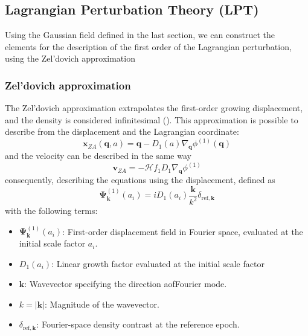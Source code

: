 \subsection{Lagrangian Perturbation Theory (LPT)}
\label{subsec:lpt_methodology}

Using the Gaussian field defined in the last section, we can construct the elements for the description of the first order of the Lagrangian perturbation, using the Zel'dovich approximation

\subsubsection{Zel'dovich approximation}

The Zel'dovich approximation extrapolates the first-order growing displacement, and the density is considered infinitesimal (\cite{white2014zeldovich,Tiago_Batalha_Lecture_7}). This approximation is possible to describe from the displacement and the Lagrangian coordinate:
    \begin{equation}
        \mathbf{x}_{ZA}(\mathbf{q},a)
        = \mathbf{q} - D_1(a)\nabla_{\mathbf{q}}\phi^{(1)}(\mathbf{q})
    \end{equation}
and the velocity can be described in the same way
    \begin{equation}
        \mathbf{v}_{ZA}
        = -\mathcal{H}f_1D_1\nabla_{\mathbf{q}}\phi^{(1)}
    \end{equation}
consequently, describing the equations using the displacement, defined as
    \begin{equation}
        \mathbf{\Psi}^{(1)}_{\mathbf{k}}(a_i)
        = iD_1(a_i)\frac{\mathbf{k}}{k^2}\delta_{\mathrm{ref},\mathbf{k}}
    \end{equation}
with the following terms:
    \begin{itemize}
        \item $\mathbf{\Psi}^{(1)}_{\mathbf{k}}(a_i)$: First-order displacement field in Fourier space, evaluated at the initial scale factor $a_i$.
    
        \item $D_1(a_i)$: Linear growth factor evaluated at the initial scale factor
    
        \item $\mathbf{k}$: Wavevector specifying the direction aofFourier mode.
    
        \item $k=|\mathbf{k}|$: Magnitude of the wavevector.
    
        \item $\delta_{\mathrm{ref},\mathbf{k}}$: Fourier-space density contrast at the reference epoch.
    \end{itemize}
    
